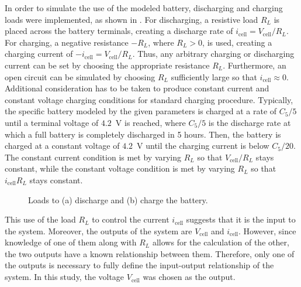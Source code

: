 \documentclass[../zhang_thesis.tex]{subfiles}
\begin{document}
In order to simulate the use of the modeled battery, discharging and charging loads were implemented, as shown in . For discharging, a resistive load $R_L$ is placed across the battery terminals, creating a discharge rate of $i_\text{cell}=V_\text{cell}/R_L$. For charging, a negative resistance $-R_L$, where $R_L>0$, is used, creating a charging current of $-i_\text{cell}=V_\text{cell}/R_L$. Thus, any arbitrary charging or discharging current can be set
by choosing the appropriate resistance $R_L$. Furthermore, an open circuit can be simulated by choosing $R_L$ sufficiently large so that $i_\text{cell}\approx 0$. Additional consideration has to be taken to produce constant current and constant voltage charging conditions for standard charging procedure. Typically, the specific battery modeled by the given parameters is charged at a rate of $C_5/5$ until a terminal voltage of $4.2$~V is reached, where $C_5/5$ is the discharge
rate at which a full battery is completely discharged in 5 hours. Then, the battery is charged at a constant voltage of $4.2$~V until the charging current is below $C_5/20$. The constant current condition is met by varying $R_L$ so that $V_\text{cell}/R_L$ stays constant, while the constant voltage condition is met by varying $R_L$ so that $i_\text{cell} R_L$ stays constant.

\begin{figure}[ht]
\centering
\begin{subfigure}[c]{0.4\textwidth}
    
\end{subfigure}
\begin{subfigure}[c]{0.55\textwidth}
    
\end{subfigure}
\caption{Loads to (a) discharge and (b) charge the battery.}
\label{fig:batt_loads}
\end{figure}

This use of the load $R_L$ to control the current $i_\text{cell}$ suggests that it is the input to the system. Moreover, the outputs of the system are $V_\text{cell}$ and $i_\text{cell}$. However, since knowledge of one of them along with $R_L$ allows for the calculation of the other, the two outputs have a known relationship between them. Therefore, only one of the outputs is necessary to fully define the input-output relationship of the system. In this study, the voltage
$V_\text{cell}$ was chosen as the output.
\end{document}
